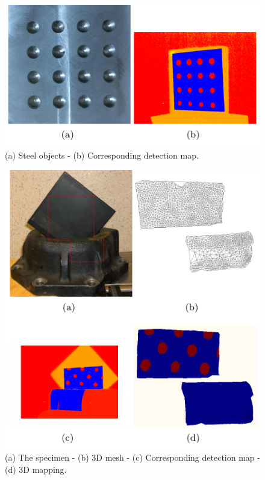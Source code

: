 \documentclass[12pt]{spieman}
\begin{document}
\begin{spacing}{2}
\newpage \begin{figure}\centering\includegraphics{Fig9}  
  \caption{(a) Steel objects - (b) Corresponding detection map.}
  \label{fig:7}
\end{figure}

\newpage \begin{figure}\centering\includegraphics{Fig10} 
  \caption{(a) The specimen - (b) 3D mesh - (c) Corresponding detection map - (d) 3D mapping.}
  \label{fig:8}
\end{figure}


\end{spacing}
\end{document}
